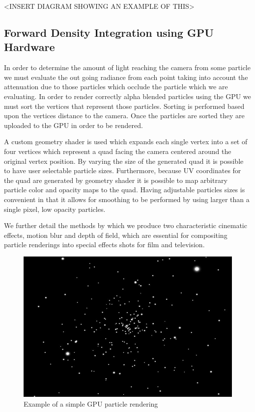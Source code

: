 \documentclass{article}
\begin{document}
<INSERT DIAGRAM SHOWING AN EXAMPLE OF THIS>

\subsection{Forward Density Integration using GPU Hardware}

In order to determine the amount of light reaching the camera from some particle we must evaluate the out going radiance from each point taking into account the attenuation due to those particles which occlude the particle which we are evaluating. In order to render correctly alpha blended particles using the GPU we must sort the vertices that represent those particles. Sorting is performed based upon the vertices distance to the camera. Once the particles are sorted they are uploaded to the GPU in order to be rendered. 

A custom geometry shader is used which expands each single vertex into a set of four vertices which represent a quad facing the camera centered around the original vertex position. By varying the size of the generated quad it is possible to have user selectable particle sizes. Furthermore, because UV coordinates for the quad are generated by geometry shader it is possible to map arbitrary particle color and opacity maps to the quad. Having adjustable particles sizes is convenient in that it allows for smoothing to be performed by using larger than a single pixel, low opacity particles.

We further detail the methods by which we produce two characteristic cinematic effects, motion blur and depth of field, which are essential for compositing particle renderings into special effects shots for film and television.

\begin{figure}[h!]
	\centering
	\includegraphics[scale=0.5]{Images/FuryBasic}
	\caption{Example of a simple GPU particle rendering}
\end{figure}
\end{document}
